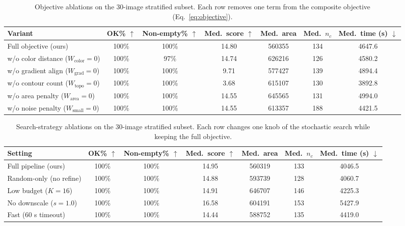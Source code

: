 \documentclass[journal]{IEEEtran}
\begin{document}
\begin{table}[t]
\centering
\caption{Objective ablations on the 30-image stratified subset. Each row removes one term from the composite objective (Eq.~\ref{eq:objective}).}
\label{tab:abl_obj}
\begin{tabular}{lcccccc}
\toprule
Variant & OK\% $\uparrow$ & Non-empty\% $\uparrow$ & Med.\ score $\uparrow$ & Med.\ area & Med.\ $n_c$ & Med.\ time (s) $\downarrow$ \\
\midrule
Full objective (ours) & 100\% & 100\% & 14.80 & 560355 & 134 & 4647.6 \\
w/o color distance ($W_{\mathrm{color}}{=}0$) & 100\% & 97\% & 14.74 & 626216 & 126 & 4580.2 \\
w/o gradient align ($W_{\mathrm{grad}}{=}0$) & 100\% & 100\% & 9.71 & 577427 & 139 & 4894.4 \\
w/o contour count ($W_{\mathrm{topo}}{=}0$) & 100\% & 100\% & 3.68 & 615107 & 130 & 3892.8 \\
w/o area penalty ($W_{\mathrm{area}}{=}0$) & 100\% & 100\% & 14.55 & 645565 & 131 & 4994.0 \\
w/o noise penalty ($W_{\mathrm{small}}{=}0$) & 100\% & 100\% & 14.55 & 613357 & 188 & 4421.5 \\
\bottomrule
\end{tabular}
\end{table}

\begin{table}[t]
\centering
\caption{Search-strategy ablations on the 30-image stratified subset. Each row changes one knob of the stochastic search while keeping the full objective.}
\label{tab:abl_search}
\begin{tabular}{lcccccc}
\toprule
Setting & OK\% $\uparrow$ & Non-empty\% $\uparrow$ & Med.\ score $\uparrow$ & Med.\ area & Med.\ $n_c$ & Med.\ time (s) $\downarrow$ \\
\midrule
Full pipeline (ours) & 100\% & 100\% & 14.95 & 560319 & 133 & 4046.5 \\
Random-only (no refine) & 100\% & 100\% & 14.88 & 593739 & 128 & 4060.7 \\
Low budget ($K{=}16$) & 100\% & 100\% & 14.91 & 646707 & 146 & 4225.3 \\
No downscale ($s{=}1.0$) & 100\% & 100\% & 16.58 & 604191 & 153 & 5427.9 \\
Fast (60 s timeout) & 100\% & 100\% & 14.44 & 588752 & 135 & 4419.0 \\
\bottomrule
\end{tabular}
\end{table}
\end{document}
